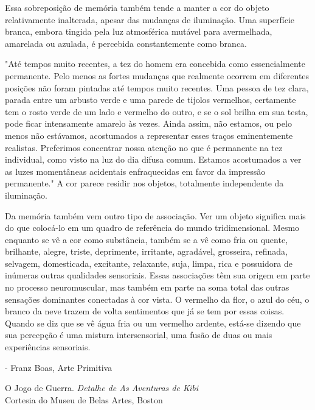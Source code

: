 \documentclass[a4paper]{article}
\begin{document}
Essa sobreposição de memória também tende a manter a cor do objeto relativamente inalterada, apesar das mudanças de iluminação. Uma superfície branca, embora tingida pela luz atmosférica mutável para avermelhada, amarelada ou azulada, é percebida constantemente como branca.

"Até tempos muito recentes, a tez do homem era concebida como essencialmente permanente. Pelo menos as fortes mudanças que realmente ocorrem em diferentes posições não foram pintadas até tempos muito recentes. Uma pessoa de tez clara, parada entre um arbusto verde e uma parede de tijolos vermelhos, certamente tem o rosto verde de um lado e vermelho do outro, e se o sol brilha em sua testa, pode ficar intensamente amarelo às vezes. Ainda assim, não estamos, ou pelo menos não estávamos, acostumados a representar esses traços eminentemente realistas. Preferimos concentrar nossa atenção no que é permanente na tez individual, como visto na luz do dia difusa comum. Estamos acostumados a ver as luzes momentâneas acidentais enfraquecidas em favor da impressão permanente." A cor parece residir nos objetos, totalmente independente da iluminação.

Da memória também vem outro tipo de associação. Ver um objeto significa mais do que colocá-lo em um quadro de referência do mundo tridimensional. Mesmo enquanto se vê a cor como substância, também se a vê como fria ou quente, brilhante, alegre, triste, deprimente, irritante, agradável, grosseira, refinada, selvagem, domesticada, excitante, relaxante, suja, limpa, rica e possuidora de inúmeras outras qualidades sensoriais. Essas associações têm sua origem em parte no processo neuromuscular, mas também em parte na soma total das outras sensações dominantes conectadas à cor vista. O vermelho da flor, o azul do céu, o branco da neve trazem de volta sentimentos que já se tem por essas coisas. Quando se diz que se vê água fria ou um vermelho ardente, está-se dizendo que sua percepção é uma mistura intersensorial, uma fusão de duas ou mais experiências sensoriais.

\noindent
- Franz Boas, Arte Primitiva

\vfill

\begin{center}
\small
O Jogo de Guerra. \textit{Detalhe de As Aventuras de Kibi} \\
Cortesia do Museu de Belas Artes, Boston
\end{center}

\vfill
\raggedright
{}
\end{document}
